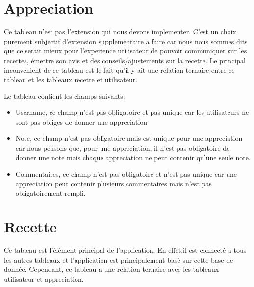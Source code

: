 \documentclass[a4paper,10pt]{report}
\begin{document}
\section{Appreciation}

Ce tableau n'est pas l'extension qui nous devons implementer. C'est un choix purement subjectif d'extension supplementaire a faire car nous nous sommes dits que ce serait mieux pour l'experience utilisateur de pouvoir communiquer sur les recettes, émettre son avis et des conseils/ajustements sur la recette. Le principal inconvénient de ce tableau est le fait qu'il y ait une relation ternaire entre ce tableau et les tableaux recette et utilisateur.

Le tableau contient les champs suivants:
\begin{itemize}
	\item Username, ce champ n'est pas obligatoire et pas unique car les utilisateurs ne sont pas obliges de donner une appreciation
	\item Note, ce champ n'est pas obligatoire mais est unique pour une appreciation car nous pensons que, pour une appreciation, il n'est pas obligatoire de donner une note mais chaque appreciation ne peut contenir qu'une seule note.
	\item Commentaires, ce champ n'est pas obligatoire et n'est pas unique car une appreciation peut contenir plusieurs commentaires mais n'est pas obligatoirement rempli.
\end{itemize}

\section{Recette}

Ce tableau est l'élément principal de l'application. En effet,il est connecté a tous les autres tableaux et l'application est principalement basé sur cette base de donnée. Cependant, ce tableau a une relation ternaire avec les tableaux utilisateur et appreciation.
\end{document}

